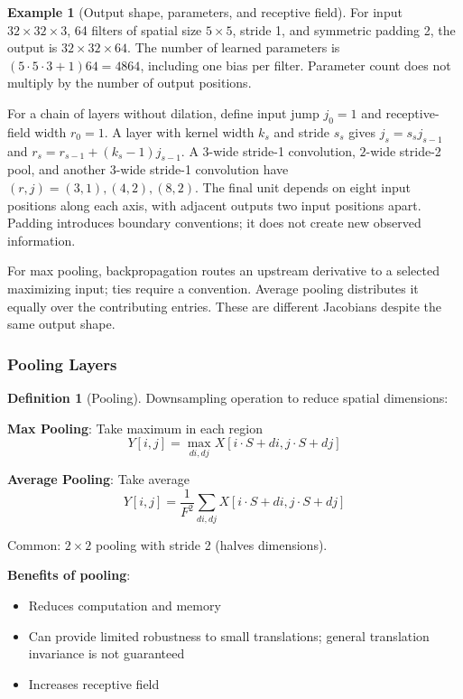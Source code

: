\documentclass[11pt,twoside]{article}
\numberwithin{equation}{section}
\theoremstyle{plain}
\theoremstyle{definition}
\newtheorem{definition}[theorem]{Definition}
\newtheorem{example}[theorem]{Example}
\theoremstyle{remark}
\begin{document}
\begin{example}[Output shape, parameters, and receptive field]
For input $32\times32\times3$, 64 filters of spatial size $5\times5$, stride 1, and symmetric padding 2, the output is $32\times32\times64$. The number of learned parameters is $(5\cdot5\cdot3+1)64=4864$, including one bias per filter. Parameter count does not multiply by the number of output positions.

For a chain of layers without dilation, define input jump $j_0=1$ and receptive-field width $r_0=1$. A layer with kernel width $k_s$ and stride $s_s$ gives $j_s=s_sj_{s-1}$ and $r_s=r_{s-1}+(k_s-1)j_{s-1}$. A $3$-wide stride-1 convolution, $2$-wide stride-2 pool, and another $3$-wide stride-1 convolution have $(r,j)=(3,1),(4,2),(8,2)$. The final unit depends on eight input positions along each axis, with adjacent outputs two input positions apart. Padding introduces boundary conventions; it does not create new observed information.
\end{example}
For max pooling, backpropagation routes an upstream derivative to a selected maximizing input; ties require a convention. Average pooling distributes it equally over the contributing entries. These are different Jacobians despite the same output shape.

\subsubsection{Pooling Layers}

\begin{definition}[Pooling]
Downsampling operation to reduce spatial dimensions:

\textbf{Max Pooling}: Take maximum in each region
\[
Y[i,j] = \max_{di,dj} X[i \cdot S + di, j \cdot S + dj]
\]

\textbf{Average Pooling}: Take average
\[
Y[i,j] = \frac{1}{F^2}\sum_{di,dj} X[i \cdot S + di, j \cdot S + dj]
\]

Common: $2 \times 2$ pooling with stride 2 (halves dimensions).
\end{definition}

\textbf{Benefits of pooling}:
\begin{itemize}
\item Reduces computation and memory
\item Can provide limited robustness to small translations; general translation invariance is not guaranteed
\item Increases receptive field
\end{itemize}
\end{document}
